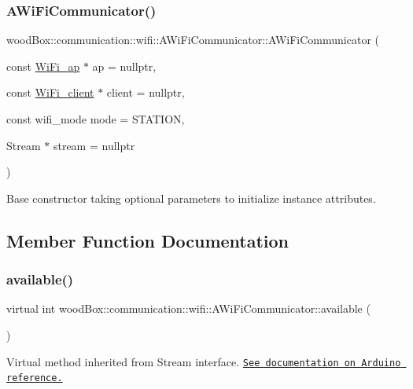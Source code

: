 \subsubsection{\texorpdfstring{A\+Wi\+Fi\+Communicator()}{AWiFiCommunicator()}}
{\footnotesize\ttfamily wood\+Box\+::communication\+::wifi\+::\+A\+Wi\+Fi\+Communicator\+::\+A\+Wi\+Fi\+Communicator (\begin{DoxyParamCaption}\item[{const \mbox{\hyperlink{structwood_box_1_1communication_1_1wifi_1_1s__wifi__access__point}{Wi\+Fi\+\_\+ap}} $\ast$}]{ap = {\ttfamily nullptr},  }\item[{const \mbox{\hyperlink{structwood_box_1_1communication_1_1wifi_1_1s__wifi__client}{Wi\+Fi\+\_\+client}} $\ast$}]{client = {\ttfamily nullptr},  }\item[{const wifi\+\_\+mode}]{mode = {\ttfamily STATION},  }\item[{Stream $\ast$}]{stream = {\ttfamily nullptr} }\end{DoxyParamCaption})}

Base constructor taking optional parameters to initialize instance attributes. 

\subsection{Member Function Documentation}
\mbox{\label{classwood_box_1_1communication_1_1wifi_1_1_a_wi_fi_communicator_a541a26bf14cf77c13cc960963944ba1d}} 
\subsubsection{\texorpdfstring{available()}{available()}}
{\footnotesize\ttfamily virtual int wood\+Box\+::communication\+::wifi\+::\+A\+Wi\+Fi\+Communicator\+::available (\begin{DoxyParamCaption}{ }\end{DoxyParamCaption})\hspace{0.3cm}{\ttfamily [pure virtual]}}

Virtual method inherited from Stream interface. \href{https://www.arduino.cc/reference/en/language/functions/communication/stream/streamavailable/}{\tt See documentation on Arduino reference.} 

